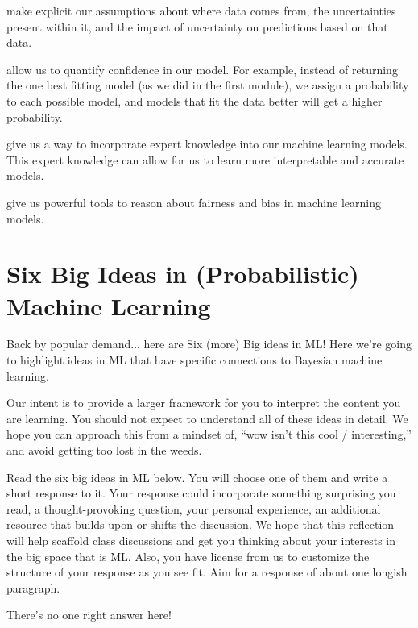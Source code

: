 \documentclass[assignment01_Solutions]{subfiles}
\begin{document}
\bi
\item make explicit our assumptions about where data comes from, the uncertainties present within it, and the impact of uncertainty on predictions based on that data.
\item allow us to quantify confidence in our model.  For example, instead of returning the one best fitting model (as we did in the first module), we assign a probability to each possible model, and models that fit the data better will get a higher probability.
\item give us a way to incorporate expert knowledge into our machine learning models.  This expert knowledge can allow for us to learn more interpretable and accurate models.
\item give us powerful tools to reason about fairness and bias in machine learning models.
\ei

\section{Six Big Ideas in (Probabilistic) Machine Learning}
Back by popular demand... here are Six (more) Big ideas in ML!  Here we're going to highlight ideas in ML that have specific connections to Bayesian machine learning.

\begin{notice}
Our intent is to provide a larger framework for you to interpret the content you are learning.  You should not expect to understand all of these ideas in detail.  We hope you can approach this from a mindset of, ``wow isn't this cool / interesting,'' and avoid getting too lost in the weeds.
\end{notice}


\begin{exercise}
Read the six big ideas in ML below.  You will choose one of them and write a short response to it.  Your response could incorporate something surprising you read, a thought-provoking question, your personal experience, an additional resource that builds upon or shifts the discussion.  We hope that this reflection will help scaffold class discussions and get you thinking about your interests in the big space that is ML.  Also, you have license from us to customize the structure of your response as you see fit.  Aim for a response of about one longish paragraph.

\begin{boxedsolution}
There's no one right answer here!
\end{boxedsolution}
\end{exercise}
\end{document}
